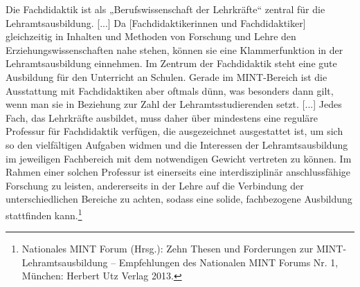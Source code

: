 \documentclass[DIV=calc]{scrartcl}
\begin{document}
\glqq Die Fachdidaktik ist als „Berufswissenschaft der Lehrkräfte“ zentral für die
Lehramtsausbildung. [...] Da [Fachdidaktikerinnen und Fachdidaktiker] gleichzeitig in Inhalten und Methoden von Forschung und Lehre den Erziehungswissenschaften nahe stehen, können sie eine Klammerfunktion in der Lehramtsausbildung einnehmen. Im Zentrum der Fachdidaktik steht eine gute Ausbildung für den Unterricht an Schulen. Gerade im MINT-Bereich ist die Ausstattung mit Fachdidaktiken aber oftmals dünn, was besonders dann gilt, wenn man sie in Beziehung zur Zahl der Lehramtsstudierenden setzt. [...] Jedes Fach, das Lehrkräfte ausbildet, muss daher über mindestens eine reguläre Professur für Fachdidaktik verfügen, die ausgezeichnet ausgestattet ist, um sich so den vielfältigen Aufgaben widmen und die Interessen der Lehramtsausbildung im jeweiligen Fachbereich mit dem notwendigen Gewicht vertreten zu können. Im Rahmen einer solchen Professur ist einerseits eine interdisziplinär anschlussfähige Forschung zu leisten, andererseits in der Lehre auf die Verbindung der unterschiedlichen Bereiche zu achten, sodass eine solide, fachbezogene Ausbildung stattfinden kann.\grqq\footnote{Nationales MINT Forum (Hrsg.): Zehn Thesen und Forderungen zur MINT-Lehramtsausbildung – Empfehlungen des Nationalen MINT Forums Nr. 1, München: Herbert Utz Verlag 2013.}
\end{document}
